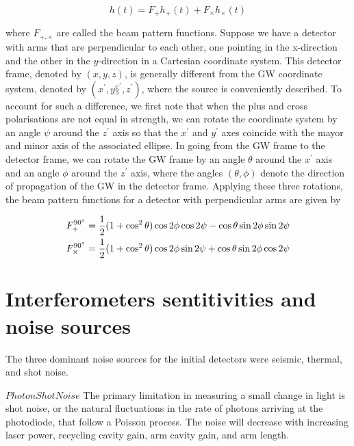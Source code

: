 \documentclass[binding=0.6cm, LaM]{sapthesis}
\begin{document}
		\begin{equation}
		h(t) = F_{+}h_{+} (t) + F_{\times}h_{\times}(t)
		\end{equation}

	where $F_{+,\times}$ are called the beam pattern functions. Suppose we have a detector 
	with arms that are perpendicular to each other, one pointing in the x-direction and the other
	in the $y$-direction in a Cartesian coordinate system. This detector frame, denoted by $(x,y,z)$, 
	is generally different from the GW coordinate system, denoted by $(x^\prime,y§^\prime,z^\prime)$, where the source
	is conveniently described. To account for such a difference, we first note that when the plus 
	and cross polarisations are not equal in strength, we can rotate the coordinate system by
	an angle $\psi$ around the $z^\prime$ axis so that the $x^\prime$ and $y^\prime$ axes 
	coincide with the mayor and minor axis of the associated ellipse.
 	In going from the GW frame to the detector frame, we can rotate the GW frame by 
	an angle $\theta$ around the $x^\prime$ axis and an angle $\phi$ around the $z^\prime$ axis,
	where the angles $(\theta, \phi)$ denote the direction of propagation of the GW in the detector frame.
	Applying these three rotations, the beam pattern functions for a detector with perpendicular arms are given by

		\begin{align}
		F_{+}^{\ang{90}}& = {1 \over 2} (1 + \cos^2 \theta)\cos 2\phi \cos 2 \psi - \cos \theta \sin2\phi \sin2\psi \\
		F_{\times}^{\ang{90}}& = {1 \over 2} (1 + \cos^2 \theta)\cos 2\phi \sin 2 \psi + \cos \theta \sin2\phi \cos2\psi
		\end{align}



\section{Interferometers sentitivities and noise sources}

	The three dominant noise sources for the initial detectors were seismic, thermal, and shot noise.

	$Photon Shot Noise$
	The primary limitation in measuring a small change in light is shot noise,
	or the natural fluctuations in the rate of photons arriving at the photodiode, 
	that follow a Poisson process. The noise will decrease with increasing laser power, 
	recycling cavity gain, arm cavity gain, and arm length.
\end{document}
